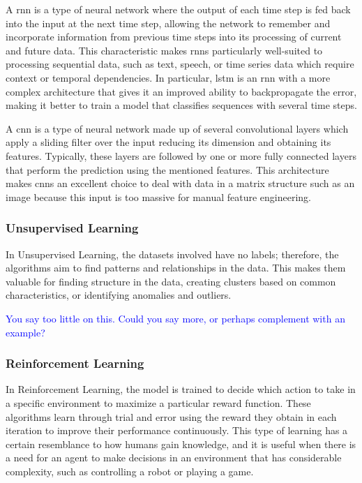 A \acf{rnn} is a type of neural network where the output of each time step is fed back into the input at the next time step, allowing the network to remember and incorporate information from previous time steps into its processing of current and future data. This characteristic makes \acp{rnn} particularly well-suited to processing sequential data, such as text, speech, or time series data which require context or temporal dependencies. In particular, \acf{lstm} is an \acs{rnn} with a more complex architecture that gives it an improved ability to backpropagate the error, making it better to train a model that classifies sequences with several time steps.

A \acf{cnn} is a type of neural network made up of several convolutional layers which apply a sliding filter over the input reducing its dimension and obtaining its features. Typically, these layers are followed by one or more fully connected layers that perform the prediction using the mentioned features. This architecture makes \acp{cnn} an excellent choice to deal with data in a matrix structure such as an image because this input is too massive for manual feature engineering.

\subsubsection{Unsupervised Learning}

In Unsupervised Learning, the datasets involved have no labels; therefore, the algorithms aim to find patterns and relationships in the data. This makes them valuable for finding structure in the data, creating clusters based on common characteristics, or identifying anomalies and outliers.

\textcolor{blue}{You say too little on this. Could you say more, or perhaps complement with an example?}

\subsubsection{Reinforcement Learning}

In Reinforcement Learning, the model is trained to decide which action to take in a specific environment to maximize a particular reward function. These algorithms learn through trial and error using the reward they obtain in each iteration to improve their performance continuously. This type of learning has a certain resemblance to how humans gain knowledge, and it is useful when there is a need for an agent to make decisions in an environment that has considerable complexity, such as controlling a robot or playing a game.

